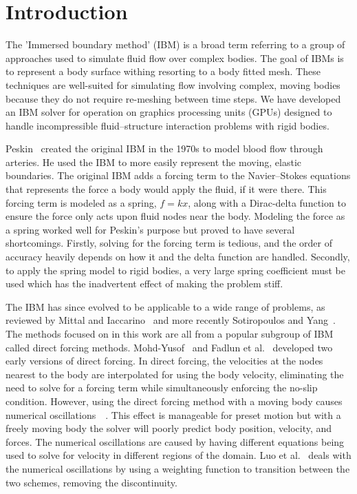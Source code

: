 \mainmatter

\chapter{Introduction}
The 'Immersed boundary method' (IBM) is a broad term referring to a group of approaches used to simulate fluid flow over complex bodies.
The goal of IBMs is to represent a body surface withing resorting to a body fitted mesh.
These techniques are well-suited for simulating flow involving complex, moving bodies because they do not require re-meshing between time steps.
We have developed an IBM solver for operation on graphics processing units (GPUs) designed to handle incompressible fluid--structure interaction problems with rigid bodies.

Peskin~\cite{Peskin:1972gh} created the original IBM in the 1970s to model blood flow through arteries. 
He used the IBM to more easily represent the moving, elastic boundaries.
The original IBM adds a forcing term to the Navier--Stokes equations that represents the force a body would apply the fluid, if it were there.
This forcing term is modeled as a spring, $f=kx$, along with a Dirac-delta function to ensure the force only acts upon fluid nodes near the body.
Modeling the force as a spring worked well for Peskin's purpose but proved to have several shortcomings.
Firstly, solving for the forcing term is tedious, and the order of accuracy heavily depends on how it and the delta function are handled. 
Secondly, to apply the spring model to rigid bodies, a very large spring coefficient must be used which has the inadvertent effect of making the problem stiff. 

The IBM has since evolved to be applicable to a wide range of problems, as reviewed by Mittal and Iaccarino~\cite{Mittal:2005ii} and more recently Sotiropoulos and Yang~\cite{Sotiropoulos:2014gv}. 
The methods focused on in this work are all from a popular subgroup of IBM called direct forcing methods. 
Mohd-Yusof~\cite{MohdYusof:1997wh} and Fadlun et al.~\cite{Fadlun:2000fl} developed two early versions of direct forcing. 
In direct forcing, the velocities at the nodes nearest to the body are interpolated for using the body velocity, eliminating the need to solve for a forcing term while simultaneously enforcing the no-slip condition.
However, using the direct forcing method with a moving body causes numerical oscillations~\cite{liao2010simulating}~\cite{Luo:2012gx}.
This effect is manageable for preset motion but with a freely moving body the solver will poorly predict body position, velocity, and forces. 
The numerical oscillations are caused by having different equations being used to solve for velocity in different regions of the domain. 
Luo et al.~\cite{Luo:2012gx} deals with the numerical oscillations by using a weighting function to transition between the two schemes, removing the discontinuity.

